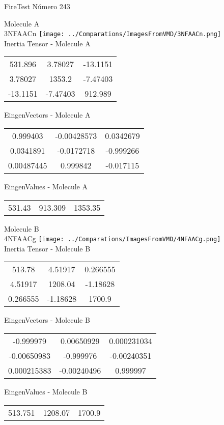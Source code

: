 \vtab[-2cm]
\begin{center}
{\large FireTest \tab Número 243}
\end{center}
\begin{multicols}{2}
\begin{center}

Molecule A \\ 
3NFAACn
\texttt{[image: ../Comparations/ImagesFromVMD/3NFAACn.png]}
\\
Inertia Tensor - Molecule A \\
\vtab

\begin{tabular}{|c c c|}
531.896	 & 	3.78027	 & 	-13.1151	 \\
3.78027	 & 	1353.2	 & 	-7.47403	 \\
-13.1151	 & 	-7.47403	 & 	912.989
\end{tabular}

\vtab
 EingenVectors - Molecule A     \\
\vtab
\begin{tabular}{|c c c|}
0.999403	 & 	-0.00428573	 & 	0.0342679	 \\
0.0341891	 & 	-0.0172718	 & 	-0.999266	 \\
0.00487445	 & 	0.999842	 & 	-0.017115
\end{tabular}

\vtab
 EingenValues - Molecule A     \\
\vtab
\begin{tabular}{|c c c|}
531.43	 & 	913.309	 & 	1353.35	 \\
\end{tabular}
\columnbreak

Molecule B \\ 
4NFAACg
\texttt{[image: ../Comparations/ImagesFromVMD/4NFAACg.png]}
\\
Inertia Tensor - Molecule B \\
\vtab

\begin{tabular}{|c c c|}
513.78	 & 	4.51917	 & 	0.266555	 \\
4.51917	 & 	1208.04	 & 	-1.18628	 \\
0.266555	 & 	-1.18628	 & 	1700.9
\end{tabular}

\vtab
 EingenVectors - Molecule B     \\
\vtab
\begin{tabular}{|c c c|}
-0.999979	 & 	0.00650929	 & 	0.000231034	 \\
-0.00650983	 & 	-0.999976	 & 	-0.00240351	 \\
0.000215383	 & 	-0.00240496	 & 	0.999997
\end{tabular}

\vtab
 EingenValues - Molecule B     \\
\vtab
\begin{tabular}{|c c c|}
513.751	 & 	1208.07	 & 	1700.9	 \\
\end{tabular}

\end{center}
\end{multicols}
